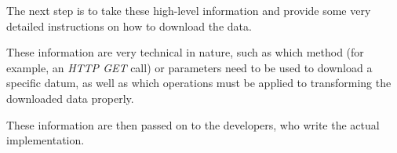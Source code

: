 The next step is to take these high-level information and provide some very detailed instructions on how to download the data.

These information are very technical in nature, such as which method (for example, an \textit{HTTP GET} call) or parameters need to be used to download a specific datum, as well as which operations must be applied to transforming the downloaded data properly.

These information are then passed on to the developers, who write the actual implementation.